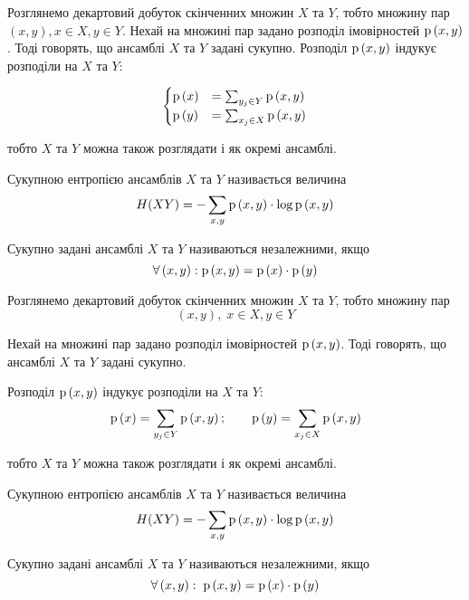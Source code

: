 Розглянемо декартовий добуток скінченних множин $X$ та $Y$, тобто
множину пар  $\left(x, y\right), x\in X, y\in Y$.
Нехай на множині пар задано розподіл
імовірностей  $\mathrm{p}\left(x, y\right)$. Тоді говорять, що ансамблі $X$ та $Y$
задані сукупно. Розподіл  $\mathrm{p}\left(x, y\right)$ індукує розподіли на $X$ та $Y$:

$$\begin{cases}
\mathrm{p}\left(x\right) &= \sum_{y_j \in Y}\mathrm{p}\left(x,y\right) \\
\mathrm{p}\left(y\right) &= \sum_{x_j \in X}\mathrm{p}\left(x,y\right)
\end{cases}$$

тобто $X$ та $Y$ можна також розглядати і як окремі ансамблі.

\begin{definition}
    Сукупною ентропією ансамблів  $X$ та  $Y$ називається величина
    $$H\!\left( XY \right)=-\sum_{x,y} \mathrm{p}\left(x,y\right) \cdot \log{\mathrm{p}\left(x,y\right)}$$
\end{definition}

\begin{definition}
    Сукупно задані ансамблі $X$ та $Y$ називаються
    незалежними, якщо
    $$\forall \left( x,y \right): \mathrm{p}\left(x,y\right) = \mathrm{p}\left(x\right) \cdot \mathrm{p}\left(y\right)$$
\end{definition}

Розглянемо декартовий добуток скінченних множин $X$ та $Y$, тобто
множину пар
$$\left( x,y \right),\; x\in X,y\in Y$$

\begin{definition}
Нехай на множині пар задано розподіл імовірностей $\mathrm{p}\left(x,y\right)$.
Тоді говорять, що ансамблі $X$ та $Y$ задані сукупно.
\end{definition}

Розподіл  $\mathrm{p}\left(x,y\right)$ індукує розподіли на $X$ та $Y$:
$$\mathrm{p}\left(x\right)=\sum_{y_j \in Y} \mathrm{p}\left(x,y\right);\qquad
    \mathrm{p}\left(y\right)=\sum_{x_j\in X} \mathrm{p}\left(x,y\right)$$

тобто $X$ та $Y$ можна також розглядати і як окремі ансамблі.

\begin{definition}
    Сукупною ентропією ансамблів  $X$ та $Y$ називається величина
    $$H\!\left( XY \right) = -\sum_{x,y} \mathrm{p}\left(x,y\right) \cdot \log{\mathrm{p}\left(x,y\right)}$$
\end{definition}

\begin{definition}
    Сукупно задані ансамблі $X$ та $Y$ називаються незалежними, якщо
    $$\forall \left( x,y \right):\; \mathrm{p}\left(x,y\right) = \mathrm{p}\left(x\right) \cdot \mathrm{p}\left(y\right)$$
\end{definition}


